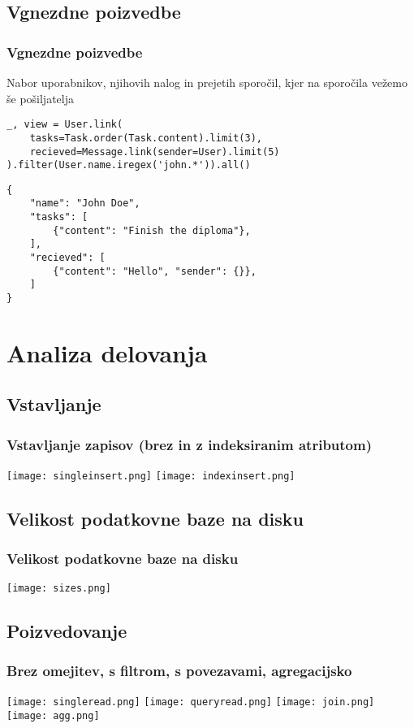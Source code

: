 \documentclass{beamer}
\begin{document}
    \subsection{Vgnezdne poizvedbe}
    \begin{frame}[fragile]
    \frametitle{Vgnezdne poizvedbe}
    \begin{block}{Nabor uporabnikov, njihovih nalog in prejetih sporočil, kjer na sporočila vežemo še pošiljatelja}
    \footnotesize
    \begin{verbatim}
_, view = User.link(
    tasks=Task.order(Task.content).limit(3), 
    recieved=Message.link(sender=User).limit(5)
).filter(User.name.iregex('john.*')).all()
        \end{verbatim}
    \end{block}

    \footnotesize
    \begin{verbatim}
{
    "name": "John Doe",
    "tasks": [
        {"content": "Finish the diploma"},
    ],
    "recieved": [
        {"content": "Hello", "sender": {}},
    ]
}
    \end{verbatim}
    \end{frame}

    
    
\section{Analiza delovanja}
    \subsection{Vstavljanje}
    \begin{frame}
        \frametitle{Vstavljanje zapisov (brez in z indeksiranim atributom)}
            \centering
            \texttt{[image: singleinsert.png]}
            \vline
            \texttt{[image: indexinsert.png]}
    \end{frame}

    \subsection{Velikost podatkovne baze na disku}
    \begin{frame}
        \frametitle{Velikost podatkovne baze na disku}
            \centering
            \texttt{[image: sizes.png]}
    \end{frame}

    \subsection{Poizvedovanje}
    \begin{frame}
        \frametitle{Brez omejitev, s filtrom, s povezavami, agregacijsko}
        \texttt{[image: singleread.png]}
        \texttt{[image: queryread.png]}
        \hline
        \texttt{[image: join.png]}
        \texttt{[image: agg.png]}
    \end{frame}
\end{document}
